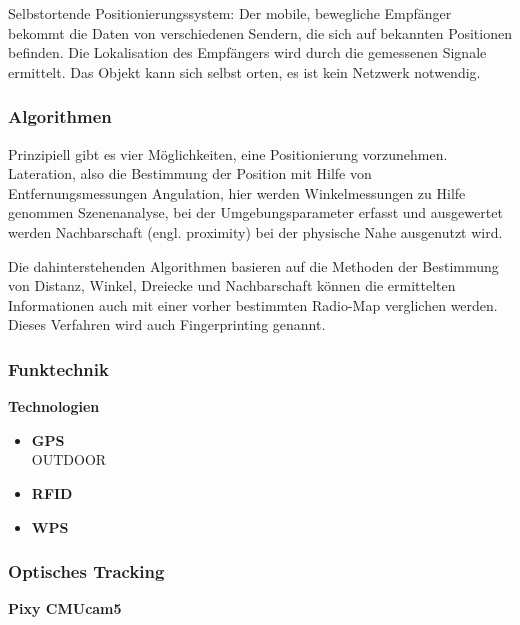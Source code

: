 Selbstortende Positionierungssystem: Der mobile, bewegliche Empfänger bekommt die Daten von verschiedenen Sendern, die sich auf bekannten Positionen befinden. Die Lokalisation des Empfängers wird durch die gemessenen Signale ermittelt. Das Objekt kann sich selbst orten, es ist kein Netzwerk notwendig.



    \subsubsection{Algorithmen}

    Prinzipiell gibt es vier Möglichkeiten, eine Positionierung vorzunehmen.
Lateration, also die Bestimmung der Position mit Hilfe von Entfernungsmessungen
Angulation, hier werden Winkelmessungen zu Hilfe genommen
Szenenanalyse, bei der Umgebungsparameter erfasst und ausgewertet werden 
Nachbarschaft (engl. proximity) bei der physische Nahe ausgenutzt wird.

Die dahinterstehenden Algorithmen basieren auf die Methoden der Bestimmung von Distanz, Winkel, Dreiecke und Nachbarschaft können die ermittelten Informationen auch mit einer vorher bestimmten Radio-Map verglichen werden. Dieses Verfahren wird auch Fingerprinting genannt.



    \subsubsection{Funktechnik}


    \textbf{Technologien}\\
    \begin{itemize}
        \item \textbf{GPS}\\
        OUTDOOR
        \item \textbf{RFID}\\
        \item \textbf{WPS}\\      
      \end{itemize}

    \subsubsection{Optisches Tracking}

    \textbf{Pixy CMUcam5}\\




